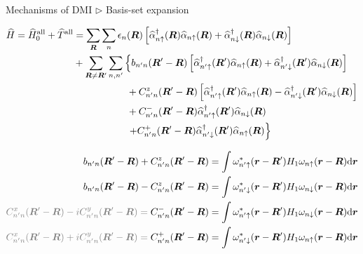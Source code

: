 \documentclass{beamer}
\newcommand{\gray}{\textcolor{gray}}
\begin{document}
  \begin{frame}{Mechanisms of DMI \(\rhd\) Basis-set expansion} 
    \scriptsize
    \begin{block}{}
      \begin{equation}\begin{aligned}
        \label{eq::H}
        \widehat{H} = \widehat{H}_0^{\text{all}} + \widehat{T}^{\text{all}} &= \sum_{\bm{R}}\sum_n{}\epsilon_n(\bm{R})\left[\widehat{\alpha}_{n\uparrow}^\dagger(\bm{R})\widehat{\alpha}_{n\uparrow}(\bm{R}) + \widehat{\alpha}_{n\downarrow}^\dagger(\bm{R})\widehat{\alpha}_{n\downarrow}(\bm{R})\right] \\
        &+\sum_{\bm{R}\ne{}\bm{R}'}\sum_{n,n'}\left\{b_{n'n}(\bm{R}'-\bm{R})\left[\widehat{\alpha}_{n'\uparrow}^{\dagger}(\bm{R}')\widehat{\alpha}_{n\uparrow}(\bm{R}) + \widehat{\alpha}_{n'\downarrow}^{\dagger}(\bm{R}')\widehat{\alpha}_{n\downarrow}(\bm{R})\right]\right.\\
        &\hspace*{5.5em} + C_{n'n}^{z}(\bm{R}'-\bm{R})\left[\widehat{\alpha}_{n'\uparrow}^{\dagger}(\bm{R}')\widehat{\alpha}_{n\uparrow}(\bm{R}) - \widehat{\alpha}_{n'\downarrow}^{\dagger}(\bm{R}')\widehat{\alpha}_{n\downarrow}(\bm{R})\right]\\
        &\hspace*{5.5em} +C_{n'n}^{-}(\bm{R}'-\bm{R})\widehat{\alpha}_{n'\uparrow}^{\dagger}(\bm{R}')\widehat{\alpha}_{n\downarrow}(\bm{R})\\
        &\left.\hspace*{5.5em} +C_{n'n}^{+}(\bm{R}'-\bm{R})\widehat{\alpha}_{n'\downarrow}^{\dagger}(\bm{R}')\widehat{\alpha}_{n\uparrow}(\bm{R})\right\}
      \end{aligned}\end{equation} 
    \end{block}
    \begin{subequations}\begin{align}
      b_{n'n}(\bm{R}'-\bm{R}) + C_{n'n}^{z}(\bm{R}'-\bm{R}) &= \int\omega_{n'\uparrow}^*(\bm{r}-\bm{R}')H_1\omega_{n\uparrow}(\bm{r}-\bm{R})\mathrm{d}\bm{r}\\ 
      b_{n'n}(\bm{R}'-\bm{R}) - C_{n'n}^{z}(\bm{R}'-\bm{R}) &= \int\omega_{n'\downarrow}^*(\bm{r}-\bm{R}')H_1\omega_{n\downarrow}(\bm{r}-\bm{R})\mathrm{d}\bm{r}\\
      \gray{C_{n'n}^{x}(\bm{R}'-\bm{R}) - iC_{n'n}^{y}(\bm{R}'-\bm{R}) = \;} C_{n'n}^{-}(\bm{R}'-\bm{R}) &= \int\omega_{n'\uparrow}^*(\bm{r}-\bm{R}')H_1\omega_{n\downarrow}(\bm{r}-\bm{R})\mathrm{d}\bm{r}\\
      \gray{C_{n'n}^{x}(\bm{R}'-\bm{R}) + iC_{n'n}^{y}(\bm{R}'-\bm{R}) = \;} C_{n'n}^{+}(\bm{R}'-\bm{R}) &= \int\omega_{n'\downarrow}^*(\bm{r}-\bm{R}')H_1\omega_{n\uparrow}(\bm{r}-\bm{R})\mathrm{d}\bm{r}
    \end{align}\end{subequations}
  \end{frame}
\end{document}
